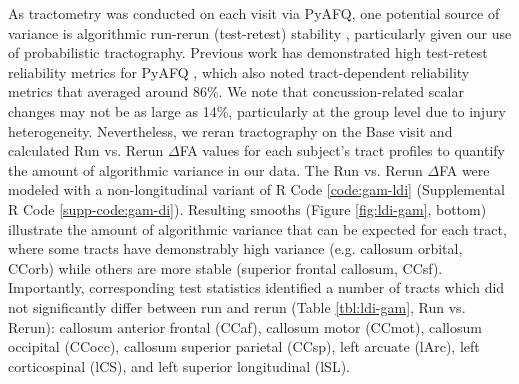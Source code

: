 \documentclass[]{imag-ms-template}
\begin{document}
As tractometry was conducted on each visit via PyAFQ, one potential source of variance is algorithmic run-rerun (test-retest) stability \parencite{wang2011LongitudinalChangesStructural}, particularly given our use of probabilistic tractography. Previous work has demonstrated high test-retest reliability metrics for PyAFQ \parencite{kruper2021EvaluatingReliabilityHuman}, which also noted tract-dependent reliability metrics that averaged around 86\%. We note that concussion-related scalar changes may not be as large as 14\%, particularly at the group level due to injury heterogeneity. Nevertheless, we reran tractography on the Base visit and calculated Run vs. Rerun $\Delta$FA values for each subject's tract profiles to quantify the amount of algorithmic variance in our data. The Run vs. Rerun $\Delta$FA were modeled with a non-longitudinal variant of R Code \ref{code:gam-ldi} (Supplemental R Code \ref{supp-code:gam-di}). Resulting smooths (Figure \ref{fig:ldi-gam}, bottom) illustrate the amount of algorithmic variance that can be expected for each tract, where some tracts have demonstrably high variance (e.g. callosum orbital, CCorb) while others are more stable (superior frontal callosum, CCsf). Importantly, corresponding test statistics identified a number of tracts which did not significantly differ between run and rerun (Table \ref{tbl:ldi-gam}, Run vs. Rerun): callosum anterior frontal (CCaf), callosum motor (CCmot), callosum occipital (CCocc), callosum superior parietal (CCsp), left arcuate (lArc), left corticospinal (lCS), and left superior longitudinal (lSL).

\begin{table}[H]
	\scriptsize
	
	\caption{Longitudinal whole-brain HGAM statistics for tract smooths. Significant non-flatness was detected for all difference smooths in the longitudinal concussion model (Post vs. Base, RTP vs. Base), and a number of tracts did not show significant differences between multiple runs of the tractography pipeline (Run vs. Rerun) e.g. CCsp. Post vs. Base = FA difference between Post and Base, RTP vs. Base = FA difference between RTP and Base, Run vs. Rerun = FA difference between multiple runs of PyAFQ. edf = effective degrees of freedom, F = F-statistic, Sig = significance. *** = p$<$.001, ** = p$<$.01, * = p$<$.05. See Figure \ref{fig:ldi-gam} for tract names.}
	\label{tbl:ldi-gam}
\end{table}
\end{document}
